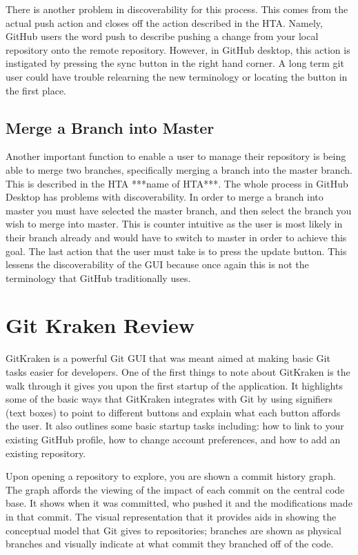 \documentclass{sigchi}
\begin{document}
There is another problem in discoverability for this process. This comes from the actual push action 
and closes off the action described in the HTA. Namely, GitHub users the word push to describe 
pushing a change from your local repository onto the remote repository. However, in GitHub desktop,
this action is instigated by pressing the sync button in the right hand corner. A long term git user
could have trouble relearning the new terminology or locating the button in the first place. 

\subsection{Merge a Branch into Master}
Another important function to enable a user to manage their repository is being able to merge two 
branches, specifically merging a branch into the master branch. This is described in the HTA 
***name of HTA***. The whole process in GitHub Desktop has problems with discoverability. In order 
to merge a branch into master you must have selected the master branch, and then select the branch 
you wish to merge into master. This is counter intuitive as the user is most likely in their branch 
already and would have to switch to master in order to achieve this goal. The last action that the user
must take is to press the update button. This lessens the discoverability of the GUI because once again
this is not the terminology that GitHub traditionally uses.

\section{Git Kraken Review}
GitKraken is a powerful Git GUI that was meant aimed at making basic Git tasks easier for developers.
One of the first things to note about GitKraken is the walk through it gives you upon the
first startup of the application. It highlights some of the basic ways that GitKraken integrates with Git by
using signifiers (text boxes) to point to different buttons and explain what each button affords the user.
It also outlines some basic startup tasks including: how to link to your existing GitHub profile, how to change
account preferences, and how to add an existing repository.

Upon opening a repository to explore, you are shown a commit history graph. The graph affords the viewing of 
the impact of each commit on the central code base. It shows when it was committed, who pushed it and
the modifications made in that commit. The visual representation that it provides aids in showing the 
conceptual model that Git gives to repositories; branches are shown as physical branches and visually indicate
at what commit they branched off of the code.
\end{document}
